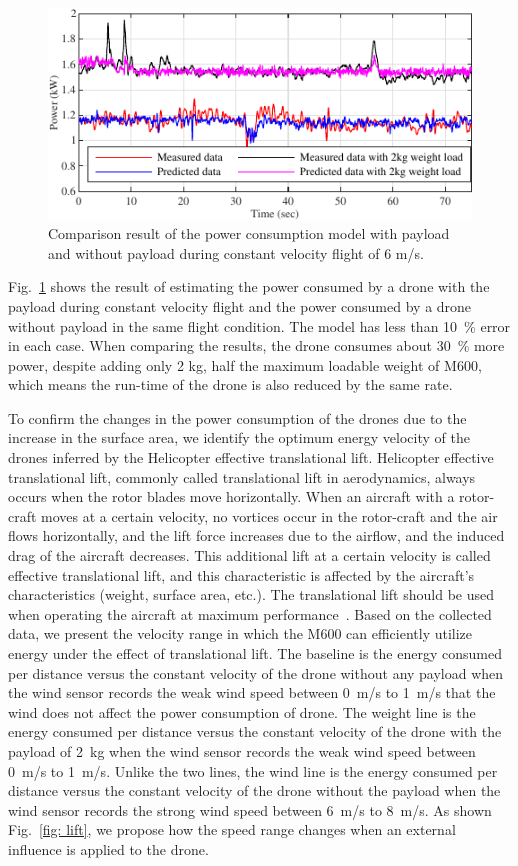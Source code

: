 \documentclass[journal]{./template/IEEEtran}
\begin{document}
\begin{figure}[ht]
\centering\includegraphics[scale=1.05]{fig9/compare_weight8x4.pdf}
\caption{Comparison result of the power consumption model with payload and without payload during constant velocity flight of 6 m/s.}
\label{fig: Model_weight}
\end{figure}

Fig.~\ref{fig: Model_weight} shows the result of estimating the power consumed by a drone with the payload during constant velocity flight and the power consumed by a drone without payload in the same flight condition. The model has less than 10~\% error in each case. 
When comparing the results, the drone consumes about 30~\% more power, despite adding only 2 kg, half the maximum loadable weight of M600, which means the run-time of the drone is also reduced by the same rate.

To confirm the changes in the power consumption of the drones due to the increase in the surface area, we identify the optimum energy velocity of the drones inferred by the Helicopter effective translational lift.
Helicopter effective translational lift, commonly called translational lift in aerodynamics, always occurs when the rotor blades move horizontally. When an aircraft with a rotor-craft moves at a certain velocity, no vortices occur in the rotor-craft and the air flows horizontally, and the lift force increases due to the airflow, and the induced drag of the aircraft decreases. 
This additional lift at a certain velocity is called effective translational lift, and this characteristic is affected by the aircraft's characteristics (weight, surface area, etc.). 
The translational lift should be used when operating the aircraft at maximum performance~\cite{ref_20}.
Based on the collected data, we present the velocity range in which the M600 can efficiently utilize energy under the effect of translational lift. 
The baseline is the energy consumed per distance versus the constant velocity of the drone without any payload when the wind sensor records the weak wind speed between 0~m/s to 1~m/s that the wind does not affect the power consumption of drone.
The weight line is the energy consumed per distance versus the constant velocity of the drone with the payload of 2~kg when the wind sensor records the weak wind speed between 0~m/s to 1~m/s.
Unlike the two lines, the wind line is the energy consumed per distance versus the constant velocity of the drone without the payload when the wind sensor records the strong wind speed between 6~m/s to 8~m/s. 
As shown Fig.~\ref{fig: lift}, we propose how the speed range changes when an external influence is applied to the drone.
\end{document}
